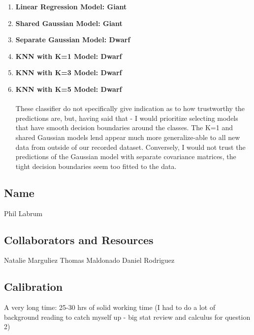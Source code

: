 \documentclass[submit]{harvardml}
\begin{document}
\begin{enumerate}
\begin{enumerate}
        \item \textbf{Linear Regression Model: Giant}
        \item \textbf{Shared Gaussian Model: Giant}
        \item \textbf{Separate Gaussian Model: Dwarf}
        \item \textbf{KNN with K=1 Model: Dwarf}
        \item \textbf{KNN with K=3 Model: Dwarf}
        \item \textbf{KNN with K=5 Model: Dwarf}\\\\
        These classifier do not specifically give indication as to how trustworthy the predictions are, but, having said that - I would prioritize selecting models that have smooth decision boundaries around the classes. The K=1 and shared Gaussian models lend appear much more generalize-able to all new data from outside of our recorded dataset. Conversely, I would not trust the predictions of the Gaussian model with separate covariance matrices, the tight decision boundaries seem too fitted to the data. 
    \end{enumerate}
\end{enumerate}

\newpage
\subsection*{Name}
Phil Labrum
\subsection*{Collaborators and Resources}
Natalie Marguliez
Thomas Maldonado
Daniel Rodriguez

\subsection*{Calibration}
A very long time: 25-30 hrs of solid working time (I had to do a lot of background reading to catch myself up - big stat review and calculus for question 2)
\end{document}
